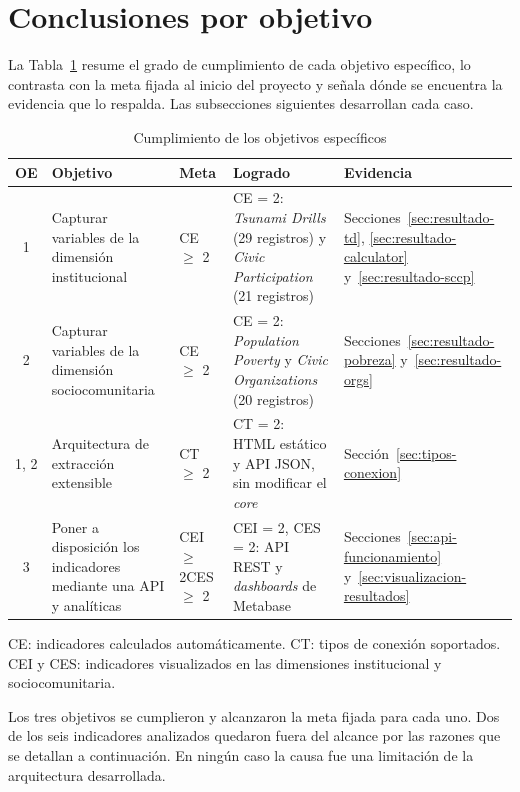 \documentclass[12pt,letterpaper,oneside]{report}
\renewcommand{\footnotesize}{\fontsize{10}{12}\selectfont}
\begin{document}
\section{Conclusiones por objetivo}
\label{sec:conclusiones-objetivos}

La Tabla~\ref{tab:cumplimiento} resume el grado de cumplimiento de cada objetivo espec\'ifico, lo contrasta con la meta fijada al inicio del proyecto y se\~nala d\'onde se encuentra la evidencia que lo respalda. Las subsecciones siguientes desarrollan cada caso.

\begin{table}[H]
\centering
\caption{Cumplimiento de los objetivos espec\'ificos}
\label{tab:cumplimiento}
\small
\begin{tabular}{|c|p{3.6cm}|p{2.2cm}|p{3.8cm}|p{2.6cm}|}
\hline
\textbf{OE} & \textbf{Objetivo} & \textbf{Meta} & \textbf{Logrado} & \textbf{Evidencia} \\
\hline
1 & Capturar variables de la dimensi\'on institucional & CE $\geq$ 2 & CE = 2: \textit{Tsunami Drills} (29 registros) y \textit{Civic Participation} (21 registros) & Secciones~\ref{sec:resultado-td}, \ref{sec:resultado-calculator} y~\ref{sec:resultado-sccp} \\
\hline
2 & Capturar variables de la dimensi\'on sociocomunitaria & CE $\geq$ 2 & CE = 2: \textit{Population Poverty} y \textit{Civic Organizations} (20 registros) & Secciones~\ref{sec:resultado-pobreza} y~\ref{sec:resultado-orgs} \\
\hline
1, 2 & Arquitectura de extracci\'on extensible & CT $\geq$ 2 & CT = 2: HTML est\'atico y API JSON, sin modificar el \textit{core} & Secci\'on~\ref{sec:tipos-conexion} \\
\hline
3 & Poner a disposici\'on los indicadores mediante una API y anal\'iticas & CEI $\geq$ 2\newline CES $\geq$ 2 & CEI = 2, CES = 2: API REST y \textit{dashboards} de Metabase & Secciones~\ref{sec:api-funcionamiento} y~\ref{sec:visualizacion-resultados} \\
\hline
\end{tabular}

\vspace{2pt}
{\footnotesize CE: indicadores calculados autom\'aticamente. CT: tipos de conexi\'on soportados. CEI y CES: indicadores visualizados en las dimensiones institucional y sociocomunitaria.}
\end{table}

Los tres objetivos se cumplieron y alcanzaron la meta fijada para cada uno. Dos de los seis indicadores analizados quedaron fuera del alcance por las razones que se detallan a continuaci\'on. En ning\'un caso la causa fue una limitaci\'on de la arquitectura desarrollada.
\end{document}
